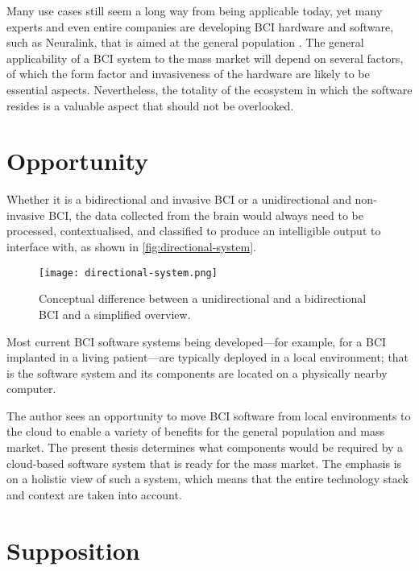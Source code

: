 Many use cases still seem a long way from being applicable today, yet many experts and even entire companies are developing BCI hardware and software, such as Neuralink, that is aimed at the general population \citep{urban_neuralink_2017}. The general applicability of a BCI system to the mass market will depend on several factors, of which the form factor and invasiveness of the hardware are likely to be essential aspects. Nevertheless, the totality of the ecosystem in which the software resides is a valuable aspect that should not be overlooked.

\section{Opportunity}
\label{chapter1-opportunity}

Whether it is a bidirectional and invasive BCI or a unidirectional and non-invasive BCI, the data collected from the brain would always need to be processed, contextualised, and classified to produce an intelligible output to interface with, as shown in \autoref{fig:directional-system}.

\begin{figure}[ht]
  \centering
  \texttt{[image: directional-system.png]}
  \caption{Conceptual difference between a unidirectional and a bidirectional BCI and a simplified overview.}
  \label{fig:directional-system}
\end{figure}

Most current BCI software systems being developed—for example, for a BCI implanted in a living patient—are typically deployed in a local environment; that is the software system and its components are located on a physically nearby computer.

The author sees an opportunity to move BCI software from local environments to the cloud to enable a variety of benefits for the general population and mass market. The present thesis determines  what components would be required by a cloud-based software system that is ready for the mass market. The emphasis is on a holistic view of such a system, which means that the entire technology stack and context are taken into account.

\section{Supposition}
\label{chapter1-supposition}

